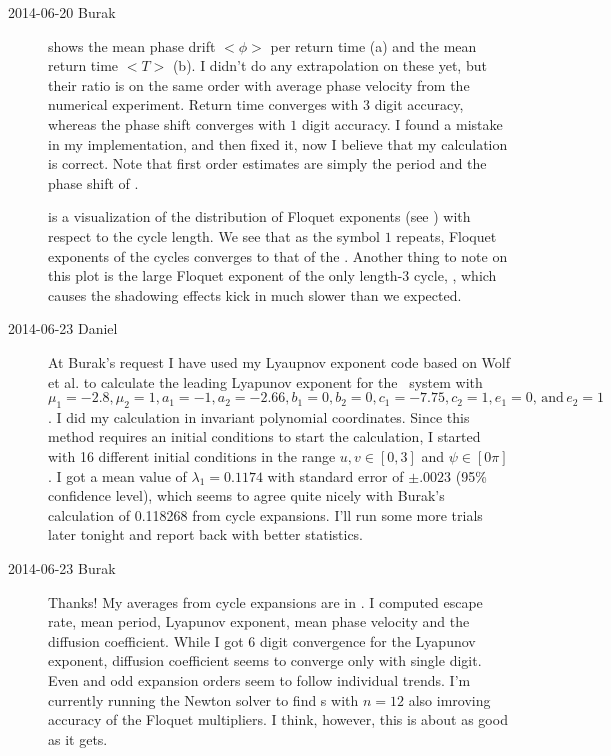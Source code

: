 \begin{description}

\item[2014-06-20 Burak]  shows the mean phase drift 
$<\phi>$ per return time (a) and the mean return time $<T>$ (b). I didn't do any
extrapolation on these yet, but their ratio is on the same order with average 
phase velocity from the numerical experiment. Return time converges with $3$
digit accuracy, whereas the phase shift converges with $1$ digit accuracy. I 
found a mistake in my implementation, and then fixed it, now I believe that my 
calculation is correct. Note that first order estimates are simply the period and
the phase shift of .

 is a visualization of the distribution of Floquet
exponents (see ) with respect to the cycle length. We 
see that as the symbol $1$ repeats, Floquet exponents of the cycles converges
to that of the . Another thing to note on this plot is the large 
Floquet exponent of the only length-$3$ cycle, , which causes the 
shadowing effects kick in much slower than we expected.

\item[2014-06-23 Daniel] At Burak's request I have used my Lyaupnov exponent code based on Wolf et al. \cite{WolfSwift85} to calculate the leading Lyapunov exponent for the \twomode\ system with $\mu_1 = -2.8, \mu_2 = 1, a_1 = -1, a_2 = -2.66, b_1 = 0, b_2 = 0, c_1 = -7.75, c_2 = 1, e_1 = 0, \,\mathrm{and}\, e_2 = 1$. I did my calculation in invariant polynomial coordinates. Since this method requires an initial conditions to start the calculation, I started with 16 different initial conditions in the range $u,v \in [0,3]$ and $\psi \in [0 \pi]$. I got a mean value of $\lambda_1 = 0.1174$ with standard error of $\pm .0023$ (95\% confidence level), which seems to agree quite nicely with Burak's calculation of 0.118268 from cycle expansions. I'll run some more trials later tonight and report back with better statistics.

\item[2014-06-23 Burak] Thanks! My averages from cycle expansions are in
.
I computed escape rate, mean period, Lyapunov exponent, mean phase velocity and
the diffusion coefficient. While I got 6 digit convergence for the Lyapunov 
exponent, diffusion coefficient seems to converge only with single digit. Even 
and odd expansion orders seem to follow individual trends. I'm currently running
the Newton solver to find \rpo s with $n=12$ also imroving accuracy of the 
Floquet multipliers. I think, however, this is about as good as it gets.


\end{description}
